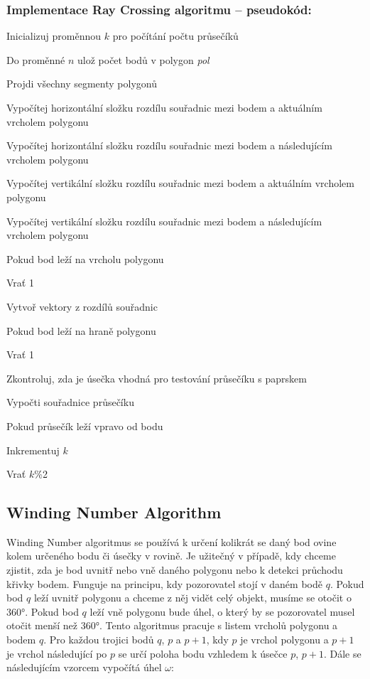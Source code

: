 \documentclass{article}
\begin{document}
\begin{spacing}{1.5}
\subsubsection{Implementace Ray Crossing algoritmu – pseudokód:}
\noindent Inicializuj proměnnou $k$ pro počítání počtu průsečíků

\noindent Do proměnné $n$ ulož počet bodů v polygon \textit{pol}

\noindent Projdi všechny segmenty polygonů

\indent Vypočítej horizontální složku rozdílu souřadnic mezi bodem a aktuálním vrcholem polygonu

\indent Vypočítej horizontální složku rozdílu souřadnic mezi bodem a následujícím vrcholem polygonu

\indent Vypočítej vertikální složku rozdílu souřadnic mezi bodem a aktuálním vrcholem polygonu

\indent Vypočítej vertikální složku rozdílu souřadnic mezi bodem a následujícím vrcholem polygonu

\indent Pokud bod leží na vrcholu polygonu

\indent\indent Vrať 1

\indent Vytvoř vektory z rozdílů souřadnic

\indent Pokud bod leží na hraně polygonu

\indent\indent Vrať 1

\indent Zkontroluj, zda je úsečka vhodná pro testování průsečíku s paprskem

\indent\indent Vypočti souřadnice průsečíku

\indent\indent Pokud průsečík leží vpravo od bodu

\indent\indent\indent Inkrementuj $k$

\noindent Vrať $k$\%2


\subsection{Winding Number Algorithm}
Winding Number algoritmus se používá k určení kolikrát se daný bod ovine kolem určeného bodu či úsečky v rovině. Je užitečný v případě, kdy chceme zjistit, zda je bod uvnitř nebo vně daného polygonu nebo k detekci průchodu křivky bodem. Funguje na principu, kdy pozorovatel stojí v daném bodě $q$. Pokud bod $q$ leží uvnitř polygonu a chceme z něj vidět celý objekt, musíme se otočit o 360°. Pokud bod $q$ leží vně polygonu bude úhel, o který by se pozorovatel musel otočit menší než 360°. Tento algoritmus pracuje s listem vrcholů polygonu a bodem $q$. Pro každou trojici bodů $q$, $p$ a $p+1$, kdy $p$ je vrchol polygonu a $p+1$ je vrchol následující po $p$ se určí poloha bodu vzhledem k úsečce $p$, $p+1$. Dále se následujícím vzorcem vypočítá úhel $\omega$:


\end{spacing}
\end{document}
